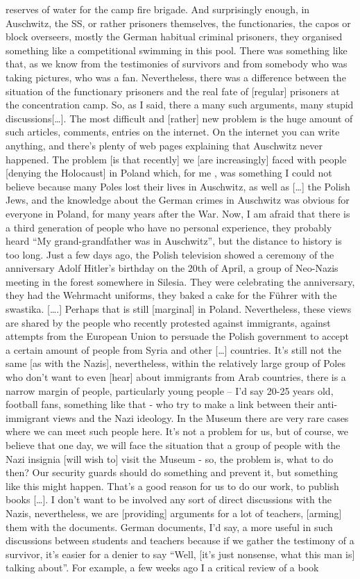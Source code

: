 reserves of water for the camp fire brigade. And surprisingly enough, in Auschwitz, the SS, or rather prisoners themselves, the functionaries, the capos or block overseers, mostly the German habitual criminal prisoners, they organised something like a competitional swimming in this pool. There was something like that, as we know from the testimonies of survivors and from somebody who was taking pictures, who was a fan. Nevertheless, there was a difference between the situation of the functionary prisoners and the real fate of [regular] prisoners at the concentration camp. 
So, as I said, there a many such arguments, many stupid discussions[…]. The most difficult and [rather] new problem is the huge amount of such articles, comments, entries on the internet. On the internet you can write anything, and there’s plenty of web pages explaining that Auschwitz never happened. The problem [is that recently] we [are increasingly] faced with people [denying the Holocaust] in Poland which, for me , was something I could not believe because many Poles lost their lives in Auschwitz, as well as […] the Polish Jews, and the knowledge about the German crimes in Auschwitz was obvious for everyone in Poland, for many years after the War. Now, I am afraid that there is a third generation of people who have no personal experience, they probably heard “My grand-grandfather was in Auschwitz”, but the distance to history is too long. Just a few days ago, the Polish television showed a ceremony of the anniversary Adolf Hitler's birthday on the 20th of April, a group of Neo-Nazis meeting in the forest somewhere in Silesia. They were celebrating the anniversary, they had the Wehrmacht uniforms, they baked a cake for the Führer with the swastika. [….] Perhaps that is still [marginal] in Poland. Nevertheless, these views are shared by the people who recently protested against immigrants, against attempts from the European Union to persuade the Polish government to accept a certain amount of people from Syria and other […] countries. It's still not the same [as with the Nazis], nevertheless, within the relatively large group of Poles who don't want to even [hear] about immigrants from Arab countries, there is a narrow margin of people, particularly young people – I’d say 20-25 years old, football fans, something like that - who try to make a link between their anti-immigrant views and the Nazi ideology. In the Museum there are very rare cases where we can meet such people here. It's not a problem for us, but of course, we believe that one day, we will face the situation that a group of people with the Nazi insignia [will wish to] visit the Museum - so, the problem is, what to do then? Our security guards should do something and prevent it, but something like this might happen. That's a good reason for us to do our work, to publish books […]. I don’t want to be involved any sort of direct discussions with the Nazis, nevertheless, we are [providing] arguments for a lot of teachers, [arming] them with the documents. German documents, I'd say, a more useful in such discussions between students and teachers because if we gather the testimony of a survivor, it’s easier for a denier to say “Well, [it’s just nonsense, what this man is] talking about”. For example, a few weeks ago I a critical review of a book 